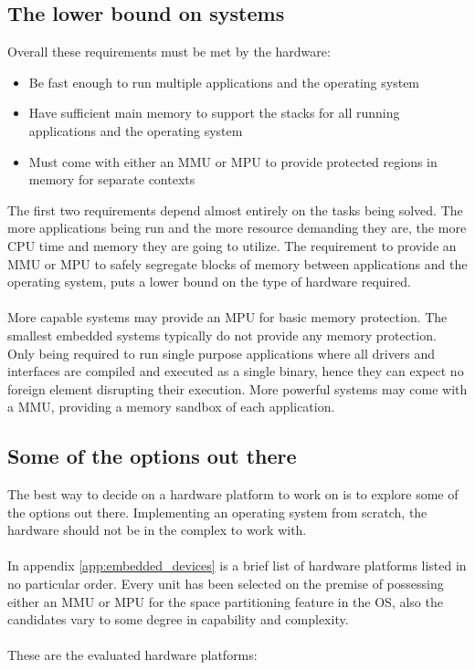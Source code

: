 \subsection{The lower bound on systems}
Overall these requirements must be met by the hardware:
\begin{itemize}
	\item Be fast enough to run multiple applications and the operating system
	\item Have sufficient main memory to support the stacks for all running applications and the operating system
	\item Must come with either an MMU or MPU to provide protected regions in memory for separate contexts
\end{itemize}
\noindent
The first two requirements depend almost entirely on the tasks being solved.
The more applications being run and the more resource demanding they are,
the more CPU time and memory they are going to utilize.
The requirement to provide an MMU or MPU to safely segregate blocks of memory between applications and the operating system,
puts a lower bound on the type of hardware required.
\\\\
More capable systems may provide an MPU for basic memory protection.
The smallest embedded systems typically do not provide any memory protection.
Only being required to run single purpose applications where all drivers and interfaces
are compiled and executed as a single binary, hence they can expect no foreign element disrupting their execution.
More powerful systems may come with a MMU,
providing a memory sandbox of each application.

\subsection{Some of the options out there}
The best way to decide on a hardware platform to work on is to explore some of the options out there.
Implementing an operating system from scratch,
the hardware should not be in the complex to work with.
\\\\
In appendix \ref{app:embedded_devices} is a brief list of hardware platforms listed in no particular order.
Every unit has been selected on the premise of possessing either an MMU or MPU for the space partitioning feature in the OS,
also the candidates vary to some degree in capability and complexity.
\\\\
These are the evaluated hardware platforms:\\

